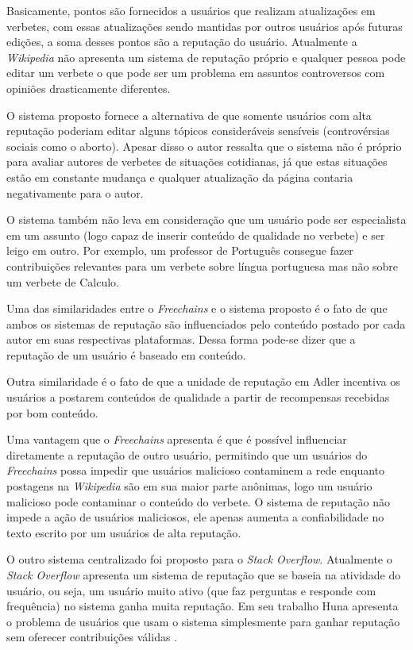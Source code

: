 \documentclass[12pt]{article}
\newcommand{\FC} {\emph{Freechains}\xspace}
\begin{document}
Basicamente, pontos são fornecidos a usuários que realizam atualizações em verbetes, com essas atualizações sendo  mantidas por outros usuários após futuras edições, a soma desses pontos são a reputação do usuário. Atualmente a \emph{Wikipedia} não apresenta um sistema de reputação próprio e qualquer pessoa pode editar um verbete o que pode ser um problema em assuntos controversos com opiniões drasticamente diferentes.

O sistema proposto fornece a alternativa de que somente usuários com alta reputação poderiam editar alguns tópicos consideráveis sensíveis (controvérsias sociais como o aborto). Apesar disso o autor ressalta que o sistema não é próprio para avaliar autores de verbetes de situações cotidianas, já que estas situações estão em constante mudança e qualquer atualização da página contaria negativamente para o autor. 

O sistema também não leva em consideração que um usuário pode ser especialista em um assunto (logo capaz de inserir conteúdo de qualidade no verbete) e ser leigo em outro. Por exemplo, um professor de Português consegue fazer contribuições relevantes para um verbete sobre língua portuguesa mas não sobre um verbete de Calculo. 

Uma das similaridades entre o \FC e o sistema proposto é o fato de que ambos os sistemas de reputação são influenciados pelo conteúdo postado por cada autor em suas respectivas plataformas. Dessa forma pode-se dizer que a reputação de um usuário é baseado em conteúdo.

Outra similaridade é o fato de que a unidade de reputação em Adler incentiva os usuários a postarem conteúdos de qualidade a partir de recompensas recebidas por bom conteúdo.

Uma vantagem que o \FC apresenta é que é possível influenciar diretamente a reputação de outro usuário, permitindo que um usuários do \FC possa impedir que usuários malicioso contaminem a rede enquanto postagens na \emph{Wikipedia} são em sua maior parte anônimas, logo um usuário malicioso pode contaminar o conteúdo do verbete. O sistema de reputação não impede a ação de usuários maliciosos, ele apenas aumenta a confiabilidade no texto escrito por um usuários de alta reputação.

O outro sistema centralizado foi proposto para o \emph{Stack Overflow}. Atualmente o \emph{Stack Overflow} apresenta um sistema de reputação que se baseia na atividade do usuário, ou seja, um usuário muito ativo (que faz perguntas e responde com frequência) no sistema ganha muita reputação. Em seu trabalho Huna apresenta o problema de usuários que usam o sistema simplesmente para ganhar reputação sem oferecer contribuições válidas \cite{huna2016exploiting}.
\end{document}
